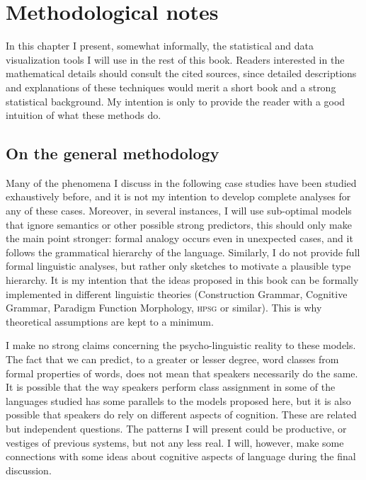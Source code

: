 \chapter{Methodological notes}\label{chap:method}

In this chapter I present, somewhat informally, the statistical and data visualization tools I will use in the rest of this book. Readers interested in the mathematical details should consult the cited sources, since detailed descriptions and explanations of these techniques would merit a short book and a strong statistical background. My intention is only to provide the reader with a good intuition of what these methods do.

\section{On the general methodology}

Many of the phenomena I discuss in the following case studies have been studied exhaustively before, and it is not my intention to develop complete analyses for any of these cases. Moreover, in several instances, I will use sub-optimal models that ignore semantics or other possible strong predictors, this should only make the main point stronger: formal analogy occurs even in unexpected cases, and it follows the grammatical hierarchy of the language. Similarly, I do not provide full formal linguistic analyses, but rather only sketches to motivate a plausible type hierarchy. It is my intention that  the ideas proposed in this book can be formally implemented in different linguistic theories (Construction Grammar, Cognitive Grammar, Paradigm Function Morphology, \textsc{hpsg} or similar). This is why theoretical assumptions are kept to a minimum.

\largerpage
I make no strong claims concerning the psycho-linguistic reality to these models. The fact that we can predict, to a greater or lesser degree, word classes from formal properties of words, does not mean that speakers necessarily do the same. It is possible that the way speakers perform class assignment in some of the languages studied has some parallels to the models proposed here, but it is also possible that speakers do rely on different aspects of cognition. These are related but independent questions. The patterns I will present could be productive, or vestiges of previous systems, but not any less real. I will, however, make some connections with some ideas about cognitive aspects of language during the final discussion.

